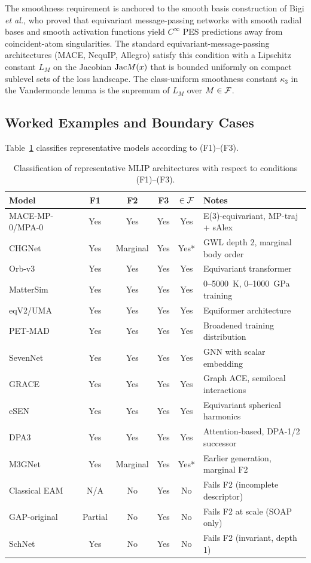 The smoothness requirement is anchored to the smooth basis construction of Bigi \emph{et al.}\cite{bigi2022smooth}, who proved that equivariant message-passing networks with smooth radial bases and smooth activation functions yield $C^\infty$ PES predictions away from coincident-atom singularities. The standard equivariant-message-passing architectures (MACE, NequIP, Allegro) satisfy this condition with a Lipschitz constant $L_M$ on the Jacobian $\mathrm{Jac} M(x)$ that is bounded uniformly on compact sublevel sets of the loss landscape. The class-uniform smoothness constant $\kappa_3$ in the Vandermonde lemma is the supremum of $L_M$ over $M \in \mathcal{F}$.

\subsection{Worked Examples and Boundary Cases}

Table~\ref{tab:class-f-examples} classifies representative models according to (F1)--(F3).

\begin{table}[htbp]
\centering
\caption{Classification of representative MLIP architectures with respect to conditions (F1)--(F3).}
\label{tab:class-f-examples}
\begin{tabular}{@{}lccccl@{}}
\toprule
\textbf{Model} & \textbf{F1} & \textbf{F2} & \textbf{F3} & $\in \mathcal{F}$ & \textbf{Notes} \\
\midrule
MACE-MP-0/MPA-0 & Yes & Yes & Yes & Yes & E(3)-equivariant, MP-traj + sAlex \\
CHGNet & Yes & Marginal & Yes & Yes* & GWL depth 2, marginal body order \\
Orb-v3 & Yes & Yes & Yes & Yes & Equivariant transformer \\
MatterSim & Yes & Yes & Yes & Yes & 0--5000~K, 0--1000~GPa training \\
eqV2/UMA & Yes & Yes & Yes & Yes & Equiformer architecture \\
PET-MAD & Yes & Yes & Yes & Yes & Broadened training distribution \\
SevenNet & Yes & Yes & Yes & Yes & GNN with scalar embedding \\
GRACE & Yes & Yes & Yes & Yes & Graph ACE, semilocal interactions \\
eSEN & Yes & Yes & Yes & Yes & Equivariant spherical harmonics \\
DPA3 & Yes & Yes & Yes & Yes & Attention-based, DPA-1/2 successor \\
M3GNet & Yes & Marginal & Yes & Yes* & Earlier generation, marginal F2 \\
\midrule
Classical EAM & N/A & No & Yes & No & Fails F2 (incomplete descriptor) \\
GAP-original & Partial & No & Yes & No & Fails F2 at scale (SOAP only) \\
SchNet & Yes & No & Yes & No & Fails F2 (invariant, depth 1) \\
\bottomrule
\end{tabular}
\end{table}

